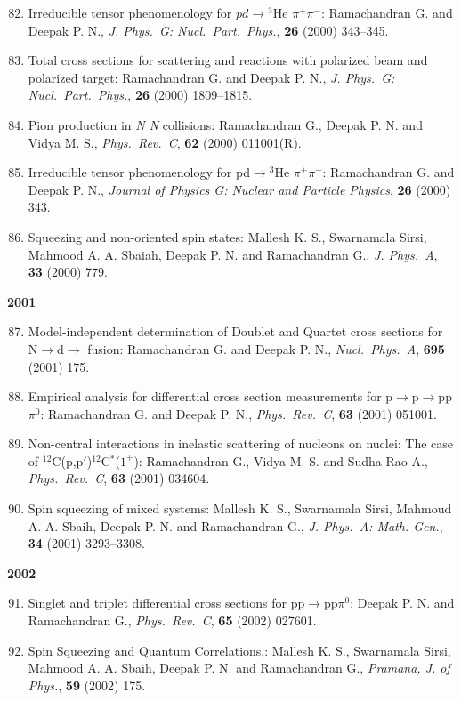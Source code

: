 \begin{enumerate}
\setcounter{enumi}{81}
\item Irreducible tensor phenomenology for $pd\to {}^{3}$He $\pi^{+}\pi^{-}$: Rama\-chandran G. and Deepak P. N., \textit{J. Phys.\ G: Nucl.\ Part.\ Phys.}, {\bf 26} (2000) 343--345.
\item Total cross sections for scattering and reactions with polarized beam and polarized target: Ramachandran G. and Deepak P. N., \textit{J. Phys.\ G: Nucl.\ Part.\ Phys.}, {\bf 26} (2000) 1809--1815.
\item Pion production in \textit{N N} collisions: Ramachandran G., Deepak P. N. and Vidya M. S., \textit{Phys.\ Rev.\ C}, {\bf 62} (2000) 011001(R).
\item Irreducible tensor phenomenology for pd$\to{}^{3}$He $\pi^{+}\pi^{-}$: Ramachandran G. and Deepak P. N., \textit{Journal of Physics G: Nuclear and Particle Physics}, {\bf 26} (2000) 343.
\item Squeezing and non-oriented spin states: Mallesh K. S., Swarnamala Sirsi, Mahmood A. A. Sbaiah, Deepak P. N. and Ramachandran G., \textit{J. Phys.\ A}, {\bf 33} (2000) 779.
\end{enumerate}
\textbf{2001}
\begin{enumerate}
\setcounter{enumi}{86}
\item Model-independent determination of Doublet and Quartet cross sections for N$\to$d$\to$ fusion: Ramachandran G. and Deepak P. N., \textit{Nucl.\ Phys.\  A}, {\bf 695} (2001) 175.
\item Empirical analysis for differential cross section measurements for p$\to$p$\to$pp$\pi^{0}$: Ramachandran G. and Deepak P. N., \textit{Phys.\ Rev.\ C}, {\bf 63} (2001) 051001.
\item Non-central interactions in inelastic scattering of nucleons on nuclei: The case of $^{12}$C(p,p$'$)$^{12}$C$^{*}$($1^{+}$): Ramachandran G., Vidya M. S. and Sudha Rao A., \textit{Phys.\ Rev.\ C}, {\bf 63} (2001) 034604.
\item Spin squeezing of mixed systems: Mallesh K. S., Swarnamala Sirsi, Mahmoud A. A. Sbaih, Deepak P. N. and Ramachandran G., \textit{J. Phys.\ A: Math. Gen.}, {\bf 34} (2001) 3293--3308.
\end{enumerate}
\textbf{2002}
\begin{enumerate}
\setcounter{enumi}{90}
\item Singlet and triplet differential cross sections for pp$\to$pp$\pi^{0}$: Deepak P. N. and Ramachandran G., \textit{Phys.\ Rev.\ C}, {\bf 65} (2002) 027601.
\item Spin Squeezing and Quantum Correlations,: Mallesh K. S., Swarnamala Sirsi, Mahmood A. A. Sbaih, Deepak P. N. and Ramachandran G., \textit{Pramana, J. of
Phys.}, {\bf 59} (2002) 175.
\end{enumerate}
